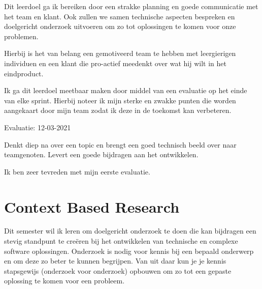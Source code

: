 Dit leerdoel ga ik bereiken door een strakke planning en goede communicatie met het team en klant.
Ook zullen we samen technische aspecten bespreken en doelgericht onderzoek uitvoeren om zo tot oplossingen te komen
voor onze problemen.


Hierbij is het van belang een gemotiveerd team te hebben met leergierigen individuen en een klant die pro-actief
meedenkt over wat hij wilt in het eindproduct.


Ik ga dit leerdoel meetbaar maken door middel van een evaluatie op het einde van elke sprint. Hierbij noteer ik
mijn sterke en zwakke punten die worden aangekaart door mijn team zodat ik deze in de toekomst kan verbeteren.

\bigskip
Evaluatie: 12-03-2021

Denkt diep na over een topic en brengt een goed technisch beeld over naar teamgenoten.
Levert een goede bijdragen aan het ontwikkelen.


\bigskip
Ik ben zeer tevreden met mijn eerste evaluatie.


\section{Context Based Research}\label{sec:context-based-research}


Dit semester wil ik leren om doelgericht onderzoek te doen die kan bijdragen een stevig
standpunt te creëren bij het ontwikkelen van technische en complexe software oplossingen.
Onderzoek is nodig voor kennis bij een bepaald onderwerp en om deze zo beter te kunnen begrijpen.
Van uit daar kun je je kennis stapsgewijs (onderzoek voor onderzoek) opbouwen om zo tot een gepaste oplossing te
komen voor een probleem.


